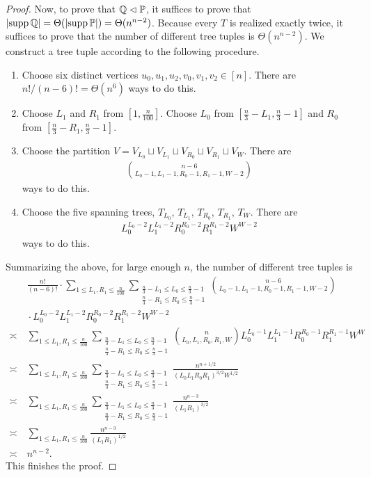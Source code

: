 \begin{proof}
  Now, to prove that $\mathbb{Q} \vartriangleleft \mathbb{P}$, it suffices to prove that $\left| \operatorname{\mathrm{supp}} \mathbb{Q} \right| = \Theta(\left| \operatorname{\mathrm{supp}} \mathbb{P} \right|) = \Theta(n^{n-2})$.
  Because every $T$ is realized exactly twice, it suffices to prove that the number of different tree tuples is $\Theta(n^{n-2})$.
  We construct a tree tuple according to the following procedure.
  \begin{enumerate}[label=(\roman*)]
    \item Choose six distinct vertices $u_0,u_1,u_2,v_0,v_1,v_2\in [n]$.
    There are $n!/(n-6)!=\Theta(n^6)$ ways to do this.
    \item Choose $L_1$ and $R_1$ from $[1, \frac{n}{100}]$.
    Choose $L_0$ from $\left[\frac n3-L_1, \frac n3-1\right]$ and $R_0$ from $\left[\frac n3-R_1, \frac n3-1\right]$.
    \item Choose the partition $V=V_{L_0}\sqcup V_{L_1}\sqcup V_{R_0}\sqcup V_{R_1} \sqcup V_W$.
    There are
    \begin{align*}
      \binom{n-6}{L_0-1,L_1-1,R_0-1,R_1-1,W-2}
    \end{align*}
    ways to do this.
    \item Choose the five spanning trees, $T_{L_0}$, $T_{L_1}$, $T_{R_0}$, $T_{R_1}$, $T_W$.
    There are
    \begin{align*}
      L_0^{L_0-2} L_1^{L_1-2} R_0^{R_0-2} R_1^{R_1-2} W^{W-2}
    \end{align*}
    ways to do this.
  \end{enumerate}
  Summarizing the above, for large enough $n$, the number of different tree tuples is
  \begin{align*}
    &~\frac{n!}{(n-6)!} \cdot \sum_{1\le L_1,R_1 \le \frac{n}{100}} \sum_{\substack{\frac n3-L_1 \le L_0 \le \frac n3-1\\ \frac n3-R_1 \le R_0 \le \frac n3-1}} \binom{n-6}{L_0-1,L_1-1,R_0-1,R_1-1,W-2} \\
    \nonumber &~\cdot L_0^{L_0-2} L_1^{L_1-2} R_0^{R_0-2} R_1^{R_1-2} W^{W-2} \\
    \nonumber \asymp &~ \sum_{1\le L_1,R_1 \le \frac{n}{100}} \sum_{\substack{\frac n3-L_1 \le L_0 \le \frac n3-1\\ \frac n3-R_1 \le R_0 \le \frac n3-1}} \binom{n}{L_0,L_1,R_0,R_1,W} L_0^{L_0-1} L_1^{L_1-1} R_0^{R_0-1} R_1^{R_1-1} W^W \\
    \nonumber \asymp &~ \sum_{1\le L_1,R_1 \le \frac{n}{100}} \sum_{\substack{\frac n3-L_1 \le L_0 \le \frac n3-1\\ \frac n3-R_1 \le R_0 \le \frac n3-1}} \frac{n^{n+1/2}}{(L_0 L_1 R_0 R_1)^{3/2} W^{1/2}} \\
    \nonumber \asymp &~ \sum_{1\le L_1,R_1 \le \frac{n}{100}} \sum_{\substack{\frac n3-L_1 \le L_0 \le \frac n3-1\\ \frac n3-R_1 \le R_0 \le \frac n3-1}} \frac{n^{n-3}}{(L_1 R_1)^{3/2}} \\
    \nonumber \asymp &~ \sum_{1\le L_1,R_1 \le \frac{n}{100}} \frac{n^{n-3}}{(L_1 R_1)^{1/2}} \\
    \nonumber \asymp &~ n^{n-2}.
  \end{align*}
  This finishes the proof.
\end{proof}

